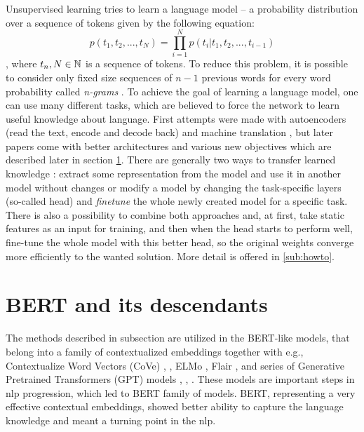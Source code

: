 \par
Unsupervised learning tries to learn a language model -- a probability distribution over a sequence of tokens given by the following equation:
 \begin{equation*}
  p(t_1, t_2,...,t_N) =\prod_{i=1}^{N} p(t_i | t_1, t_2, ..., t_{i-1})
\end{equation*}\citep{Liu2020}, where $t_n, N \in \mathbb{N}$ is a sequence of tokens. To reduce this problem, it is possible to consider only fixed size sequences of $n-1$ previous words for every word probability called \textit{n-grams} \citep{Bengio2003}. To achieve the goal of learning a language model, one can use many different tasks, which are believed to force the network to learn useful knowledge about language. First attempts were made with autoencoders (read the text, encode and decode back) \citep{Dai2015} and machine translation \citep{Ramachandran2017}, but later papers come with better architectures and various new objectives which are described later in section \ref{sec:bert}.  There are generally two ways to transfer learned knowledge \citep{Feijo2020}: extract some representation from the model and use it in another model without changes or modify a model by changing the task-specific layers (so-called head) and \textit{finetune} the whole newly created model for a specific task. There is also a possibility to combine both approaches and, at first, take static features as an input for training, and then when the head starts to perform well, fine-tune the whole model with this better head, so the original weights converge more efficiently to the wanted solution. More detail is offered in \ref{sub:howto}.
\section{BERT and its descendants}
\label{sec:bert}
The methods described in subsection %
are utilized in the BERT-like models, that belong into a family of contextualized embeddings together with e.g., Contextualize Word Vectors (CoVe) \citep{McCann2017}, \citep{Peters2017}, ELMo \citep{Peters2018}, Flair \citep{Akbik2018}, and series of Generative Pretrained Transformers (GPT) models \citep{Radfort2018}, \citep{RadfordAlec2019}, \citep{Brown2020}. These models are important steps in \acrshort{nlp} progression, which led to BERT family of models. BERT, representing a very effective contextual %
 embeddings, showed better ability to capture the language knowledge and meant a turning point in the \acrshort{nlp}.
